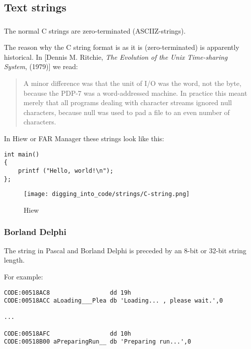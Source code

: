 \subsection{Text strings}

\subsubsection{\CCpp}

\label{C_strings}
The normal C strings are zero-terminated (\ac{ASCIIZ}-strings).

The reason why the C string format is as it is (zero-terminated) is apparently historical.
In [Dennis M. Ritchie, \emph{The Evolution of the Unix Time-sharing System}, (1979)]
we read:

\begin{framed}
\begin{quotation}
A minor difference was that the unit of I/O was the word, not the byte, because the PDP-7 was a word-addressed
machine. In practice this meant merely that all programs dealing with character streams ignored null
characters, because null was used to pad a file to an even number of characters.
\end{quotation}
\end{framed}


In Hiew or FAR Manager these strings look like this:

\begin{lstlisting}[style=customc]
int main()
{
	printf ("Hello, world!\n");
};
\end{lstlisting}

\begin{figure}[H]
\centering
\texttt{[image: digging\_into\_code/strings/C-string.png]}
\caption{Hiew}
\end{figure}


\subsubsection{Borland Delphi}

The string in Pascal and Borland Delphi is preceded by an 8-bit or 32-bit string length.

For example:

\begin{lstlisting}[caption=Delphi,style=customasmx86]
CODE:00518AC8                 dd 19h
CODE:00518ACC aLoading___Plea db 'Loading... , please wait.',0

...

CODE:00518AFC                 dd 10h
CODE:00518B00 aPreparingRun__ db 'Preparing run...',0
\end{lstlisting}


